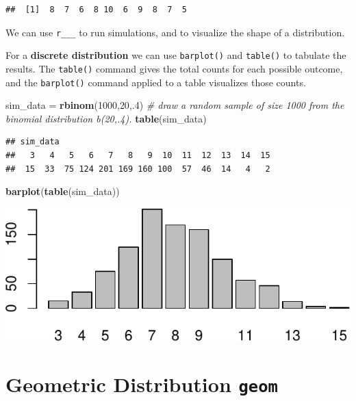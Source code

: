 \documentclass[
]{book}
\newenvironment{Shaded}{\begin{snugshade}}{\end{snugshade}}
\newcommand{\CommentTok}[1]{\textcolor[rgb]{0.56,0.35,0.01}{\textit{#1}}}
\newcommand{\DecValTok}[1]{\textcolor[rgb]{0.00,0.00,0.81}{#1}}
\newcommand{\FunctionTok}[1]{\textcolor[rgb]{0.13,0.29,0.53}{\textbf{#1}}}
\newcommand{\NormalTok}[1]{#1}
\newcommand{\OtherTok}[1]{\textcolor[rgb]{0.56,0.35,0.01}{#1}}
\theoremstyle{definition}
\theoremstyle{definition}
\theoremstyle{definition}
\theoremstyle{definition}
\theoremstyle{remark}
\begin{document}
\begin{verbatim}
##  [1]  8  7  6  8 10  6  9  8  7  5
\end{verbatim}

We can use \texttt{r\_\_\_} to run simulations, and to visualize the shape of a distribution.

For a \textbf{discrete distribution} we can use \texttt{barplot()} and \texttt{table()} to tabulate the results. The \texttt{table()} command gives the total counts for each possible outcome, and the \texttt{barplot()} command applied to a table visualizes those counts.

\begin{Shaded}
\begin{Highlighting}[]
\NormalTok{sim\_data }\OtherTok{=} \FunctionTok{rbinom}\NormalTok{(}\DecValTok{1000}\NormalTok{,}\DecValTok{20}\NormalTok{,.}\DecValTok{4}\NormalTok{) }\CommentTok{\# draw a random sample of size 1000 from the binomial distribution b(20,.4).}
\FunctionTok{table}\NormalTok{(sim\_data)}
\end{Highlighting}
\end{Shaded}

\begin{verbatim}
## sim_data
##   3   4   5   6   7   8   9  10  11  12  13  14  15 
##  15  33  75 124 201 169 160 100  57  46  14   4   2
\end{verbatim}

\begin{Shaded}
\begin{Highlighting}[]
\FunctionTok{barplot}\NormalTok{(}\FunctionTok{table}\NormalTok{(sim\_data))}
\end{Highlighting}
\end{Shaded}

\includegraphics{math340-notes_files/figure-latex/unnamed-chunk-147-1.pdf}

\section{\texorpdfstring{Geometric Distribution \texttt{geom}}{Geometric Distribution geom}}\label{geometric-distribution-geom}
\end{document}
